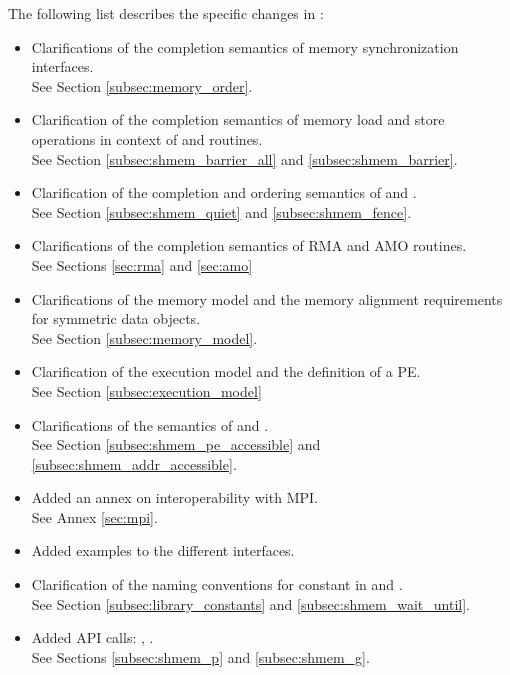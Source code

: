The following list describes the specific changes in \openshmem[1.1]:
\begin{itemize}
%
\item Clarifications of the completion semantics of memory synchronization
      interfaces.
\\See Section \ref{subsec:memory_order}.
%
\item Clarification of the completion semantics of memory load and store
      operations in context of  and 
      routines.
\\See Section \ref{subsec:shmem_barrier_all} and \ref{subsec:shmem_barrier}.
%
\item Clarification of the completion and ordering semantics of
       and .
\\See Section \ref{subsec:shmem_quiet} and \ref{subsec:shmem_fence}.
%
\item Clarifications of the completion semantics of \ac{RMA} and \ac{AMO}
      routines.
\\See Sections \ref{sec:rma} and \ref{sec:amo}
%
\item Clarifications of the memory model and the memory alignment requirements
      for symmetric data objects.
\\See Section \ref{subsec:memory_model}.
%
\item Clarification of the execution model and the definition of a \ac{PE}.
\\See Section \ref{subsec:execution_model}
%
\item Clarifications of the semantics of  and
      .
\\See Section \ref{subsec:shmem_pe_accessible} and \ref{subsec:shmem_addr_accessible}.
%
\item Added an annex on interoperability with \ac{MPI}.
\\See Annex \ref{sec:mpi}.
%
\item Added examples to the different interfaces.
%
\item Clarification of the naming conventions for constant in \Cstd and
      \Fortran.
\\See Section \ref{subsec:library_constants} and \ref{subsec:shmem_wait_until}.
%
\item Added \ac{API} calls: , .
\\See Sections \ref{subsec:shmem_p} and \ref{subsec:shmem_g}.

\end{itemize}
